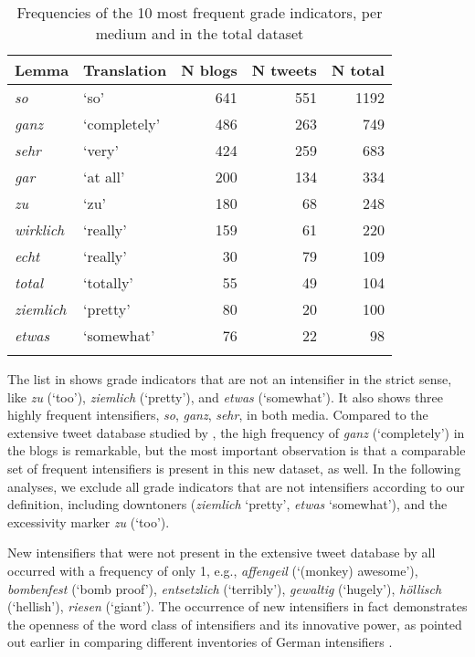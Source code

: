 \documentclass[output=paper,colorlinks,citecolor=brown]{langscibook}
\begin{document}
\begin{table}
\begin{center}
\begin{tabular}{llrrr}
\lsptoprule
Lemma & Translation & N blogs &  N tweets &   N total \\\midrule
\textit{so} & `so' &641 & 551& 1192	\\
\textit{ganz} & `completely'& 486 & 263 & 749 \\
\textit{sehr} & `very' & 424 & 259 & 683 \\
\textit{gar} & `at all'& 200 & 134 & 334 \\
\textit{zu} & `zu' & 180 & 68 & 248 \\
\textit{wirklich} & `really' & 159 & 61 & 220 \\
\textit{echt} & `really' & 30 & 79 & 109 \\
\textit{total} & `totally' & 55 & 49 & 104 \\
\textit{ziemlich} & `pretty' & 80 & 20 & 100 \\
\textit{etwas} & `somewhat'& 76 & 22 & 98 \\
\lspbottomrule
\end{tabular} 
\caption{Frequencies of the 10 most frequent grade indicators, per medium and in the total dataset}\label{tab:intlist}
\end{center}
\end{table}

The list in  shows grade indicators that are not an intensifier in the strict sense, like \textit{zu} (`too'), \textit{ziemlich} (`pretty'), and \textit{etwas} (`somewhat'). It also shows three highly frequent intensifiers, \textit{so}, \textit{ganz}, \textit{sehr}, in both media. Compared to the extensive tweet database studied by \citet{scherihou2022}, the high frequency of \textit{ganz} (`completely') in the blogs is remarkable, but the most important observation is that a comparable set of frequent intensifiers is present in this new dataset, as well. In the following analy\-ses, we exclude all grade indicators that are not intensifiers according to our definition, including downtoners (\textit{ziemlich} `pretty',  \textit{etwas} `somewhat'), and the excessivity marker \textit{zu} (`too').

New intensifiers that were not present in the extensive tweet database by \citet{scherihou2022} all occurred with a frequency of only 1, e.g.,
\textit{affengeil} (`(monkey) awesome'),
\textit{bombenfest} (`bomb proof'),
\textit{entsetzlich} (`terribly'),
\textit{gewaltig} (`hugely'),
\textit{höllisch} (`hellish'),
\textit{riesen} (`giant').
The occurrence of new intensifiers in fact demonstrates the openness of the word class of intensifiers and its innovative power, as pointed out earlier in comparing different inventories of German intensifiers \citep{scherihou2022}.
\end{document}
